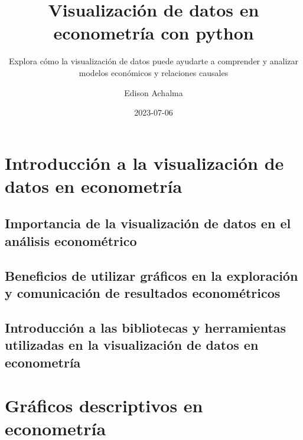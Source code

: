 \documentclass[
  a4paper,
]{article}
\title{Visualización de datos en econometría con python}
\subtitle{Explora cómo la visualización de datos puede ayudarte a
comprender y analizar modelos económicos y relaciones causales}
\author{Edison Achalma}
\date{2023-07-06}
\begin{document}
\maketitle
\ifdefined\Shaded\renewenvironment{Shaded}{\begin{tcolorbox}[borderline west={3pt}{0pt}{shadecolor}, boxrule=0pt, frame hidden, breakable, enhanced, interior hidden, sharp corners]}{\end{tcolorbox}}\fi

\hypertarget{introducciuxf3n-a-la-visualizaciuxf3n-de-datos-en-econometruxeda}{%
\section{Introducción a la visualización de datos en
econometría}\label{introducciuxf3n-a-la-visualizaciuxf3n-de-datos-en-econometruxeda}}

\hypertarget{importancia-de-la-visualizaciuxf3n-de-datos-en-el-anuxe1lisis-economuxe9trico}{%
\subsection{Importancia de la visualización de datos en el análisis
econométrico}\label{importancia-de-la-visualizaciuxf3n-de-datos-en-el-anuxe1lisis-economuxe9trico}}

\hypertarget{beneficios-de-utilizar-gruxe1ficos-en-la-exploraciuxf3n-y-comunicaciuxf3n-de-resultados-economuxe9tricos}{%
\subsection{Beneficios de utilizar gráficos en la exploración y
comunicación de resultados
econométricos}\label{beneficios-de-utilizar-gruxe1ficos-en-la-exploraciuxf3n-y-comunicaciuxf3n-de-resultados-economuxe9tricos}}

\hypertarget{introducciuxf3n-a-las-bibliotecas-y-herramientas-utilizadas-en-la-visualizaciuxf3n-de-datos-en-econometruxeda}{%
\subsection{Introducción a las bibliotecas y herramientas utilizadas en
la visualización de datos en
econometría}\label{introducciuxf3n-a-las-bibliotecas-y-herramientas-utilizadas-en-la-visualizaciuxf3n-de-datos-en-econometruxeda}}

\hypertarget{gruxe1ficos-descriptivos-en-econometruxeda}{%
\section{Gráficos descriptivos en
econometría}\label{gruxe1ficos-descriptivos-en-econometruxeda}}
\end{document}
